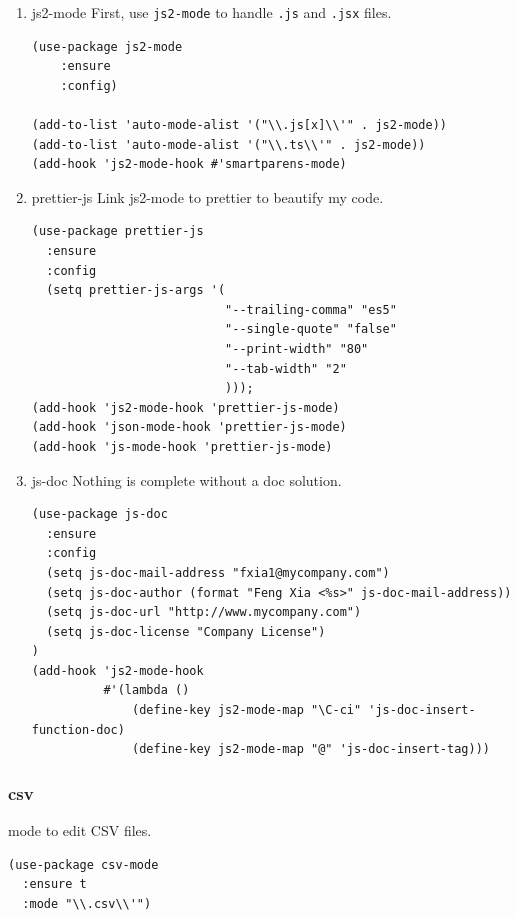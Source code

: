 \documentclass[11pt]{article}
\begin{document}
\begin{enumerate}
\item js2-mode
\label{sec:org6507fca}
First, use \texttt{js2-mode} to handle \texttt{.js} and \texttt{.jsx} files.

\begin{verbatim}
(use-package js2-mode
    :ensure
    :config)

(add-to-list 'auto-mode-alist '("\\.js[x]\\'" . js2-mode))
(add-to-list 'auto-mode-alist '("\\.ts\\'" . js2-mode))
(add-hook 'js2-mode-hook #'smartparens-mode)

\end{verbatim}

\item prettier-js
\label{sec:orgc4e1412}
Link js2-mode to prettier to beautify my code.
\begin{verbatim}
(use-package prettier-js
  :ensure
  :config
  (setq prettier-js-args '(
                           "--trailing-comma" "es5"
                           "--single-quote" "false"
                           "--print-width" "80"
                           "--tab-width" "2"
                           )));
(add-hook 'js2-mode-hook 'prettier-js-mode)
(add-hook 'json-mode-hook 'prettier-js-mode)
(add-hook 'js-mode-hook 'prettier-js-mode)
\end{verbatim}

\item js-doc
\label{sec:org87ad9e0}
Nothing is complete without a doc solution.

\begin{verbatim}
(use-package js-doc
  :ensure
  :config
  (setq js-doc-mail-address "fxia1@mycompany.com")
  (setq js-doc-author (format "Feng Xia <%s>" js-doc-mail-address))
  (setq js-doc-url "http://www.mycompany.com")
  (setq js-doc-license "Company License")
)
(add-hook 'js2-mode-hook
          #'(lambda ()
              (define-key js2-mode-map "\C-ci" 'js-doc-insert-function-doc)
              (define-key js2-mode-map "@" 'js-doc-insert-tag)))

\end{verbatim}
\end{enumerate}
\subsubsection{csv}
\label{sec:org4859fc1}
mode to edit CSV files.
\begin{verbatim}
(use-package csv-mode
  :ensure t
  :mode "\\.csv\\'")
\end{verbatim}
\end{document}
